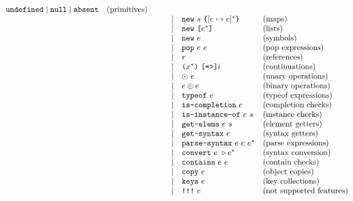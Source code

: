 \[\begin{array}{lrclrll}
          \C{undefined} \mid \C{null} \mid \C{absent}           & \text{(primitives)}\\
    &&&&\mid& \C{new}\ \str\ \C{\{}[\expr \mapsto \expr]^*\C{\}}& \text{(maps)}\\
    &&&&\mid& \C{new}\ \C{[} \expr^* \C{]}                      & \text{(lists)}\\
    &&&&\mid& \C{new}\ \expr                                    & \text{(symbols)}\\
    &&&&\mid& \C{pop}\ \expr\ \expr                             & \text{(pop expressions)}\\
    &&&&\mid& \refer                                            & \text{(references)}\\
    &&&&\mid& \C{(} \id^* \C{)}\ \C{[=>]} \inst                 & \text{(continuations)}\\
    &&&&\mid& \uop\ \expr                                       & \text{(unary operations)}\\
    &&&&\mid& \expr \bop \expr                                  & \text{(binary operations)}\\
    &&&&\mid& \C{typeof}\ \expr                                 & \text{(typeof expressions)}\\
    &&&&\mid& \C{is-completion}\ \expr                          & \text{(completion checks)}\\
    &&&&\mid& \C{is-instance-of}\ \expr\ \str                   & \text{(instance checks)}\\
    &&&&\mid& \C{get-elems}\ \expr\ \str                        & \text{(element getters)}\\
    &&&&\mid& \C{get-syntax}\ \expr                             & \text{(syntax getters)}\\
    &&&&\mid& \C{parse-syntax}\ \expr\ \expr\ \expr^*           & \text{(parse expressions)}\\
    &&&&\mid& \C{convert}\ \expr\ \cop \expr^*                  & \text{(syntax conversion)}\\
    &&&&\mid& \C{contains}\ \expr\ \expr                        & \text{(contain checks)}\\
    &&&&\mid& \C{copy}\ \expr                                   & \text{(object copies)}\\
    &&&&\mid& \C{keys}\ \expr                                   & \text{(key collections)}\\
    &&&&\mid& \C{!!!}\ \expr                                    & \text{(not supported features)}\\
  \end{array}
\]

